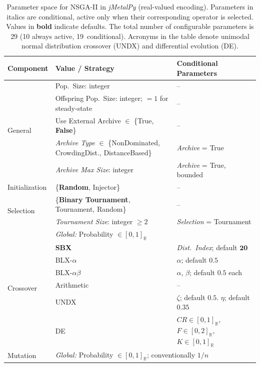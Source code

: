 \documentclass[final,5p,times,twocolumn]{elsarticle}
\newcommand{\Realdomain}[1]{[#1]_{\mathbb{R}}}
\begin{document}
\begin{table}[htbp]
\centering
\caption{Parameter space for NSGA-II in \textit{jMetalPy} (real-valued encoding). Parameters in italics are conditional, active only when their corresponding operator is selected. Values in \textbf{bold} indicate defaults. The total number of configurable parameters is 29 (10 always active, 19~conditional). Acronyms in the table denote unimodal normal distribution crossover (UNDX) and differential evolution (DE).}
\label{tab:parameter_space_jmetalpy}
\begin{tabular}{lll}
\toprule
\textbf{Component} & \textbf{Value / Strategy} & \textbf{Conditional Parameters} \\ \midrule
\multirow{5}{*}{General} & Pop.\ Size: integer & -- \\
 & Offspring Pop.\ Size: integer; $= 1$ for steady-state & -- \\
 & Use External Archive $\in$ \{True, \textbf{False}\} & -- \\
 & \textit{Archive Type} $\in$ \{NonDominated, CrowdingDist., DistanceBased\} & \textit{Archive} = True \\
 & \textit{Archive Max Size}: integer & \textit{Archive} = True, bounded \\ \midrule
\multirow{1}{*}{Initialization} & \{\textbf{Random}, Injector\} & -- \\ \midrule
\multirow{2}{*}{Selection} & \{\textbf{Binary Tournament}, Tournament, Random\} & -- \\
 & \textit{Tournament Size}: integer $\geq 2$ & \textit{Selection} = Tournament \\ \midrule
\multirow{7}{*}{Crossover} & \multicolumn{2}{l}{\textit{Global:} Probability $\in \Realdomain{0, 1}$} \\
 & \textbf{SBX} & \textit{Dist.\ Index}; default $\mathbf{20}$ \\
 & BLX-$\alpha$ & $\alpha$; default $0.5$ \\
 & BLX-$\alpha\beta$ & $\alpha$, $\beta$; default $0.5$ each \\
 & Arithmetic & -- \\
 & UNDX & $\zeta$; default $0.5$. $\eta$; default $0.35$ \\
 & DE & $CR \in \Realdomain{0, 1}$, $F \in \Realdomain{0, 2}$, $K \in \Realdomain{0, 1}$ \\ \midrule
\multirow{7}{*}{Mutation} & \multicolumn{2}{l}{\textit{Global:} Probability $\in \Realdomain{0, 1}$; conventionally $1/n$} \\

\end{tabular}
\end{table}
\end{document}
